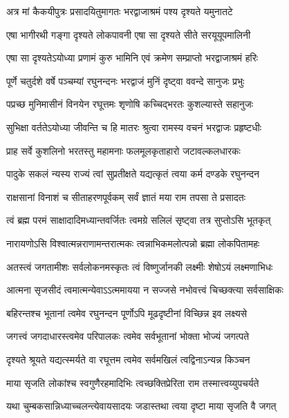 \twolineshloka
{अत्र मां कैकयीपुत्रः प्रसादयितुमागतः}
{भरद्वाजाश्रमं पश्य दृश्यते यमुनातटे} %

\twolineshloka
{एषा भागीरथी गङ्गा दृश्यते लोकपावनी}
{एषा सा दृश्यते सीते सरयूयूपमालिनी} %

\twolineshloka
{एषा सा दृश्यतेऽयोध्या प्रणामं कुरु भामिनि}
{एवं क्रमेण सम्प्राप्तो भरद्वाजाश्रमं हरिः} %

\twolineshloka
{पूर्णे चतुर्दशे वर्षे पञ्चम्यां रघुनन्दनः}
{भरद्वाजं मुनिं दृष्ट्वा ववन्दे सानुजः प्रभुः} %

\twolineshloka
{पप्रच्छ मुनिमासीनं विनयेन रघूत्तमः}
{शृणोषि कच्चिद्भरतः कुशल्यास्ते सहानुजः} %

\twolineshloka
{सुभिक्षा वर्ततेऽयोध्या जीवन्ति च हि मातरः}
{श्रुत्वा रामस्य वचनं भरद्वाजः प्रहृष्टधीः} %

\twolineshloka
{प्राह सर्वे कुशलिनो भरतस्तु महामनाः}
{फलमूलकृताहारो जटावल्कलधारकः} %

\twolineshloka
{पादुके सकलं न्यस्य राज्यं त्वां सुप्रतीक्षते}
{यद्यत्कृतं त्वया कर्म दण्डके रघुनन्दन} %

\twolineshloka
{राक्षसानां विनाशं च सीताहरणपूर्वकम्}
{सर्वं ज्ञातं मया राम तपसा ते प्रसादतः} %

\twolineshloka
{त्वं ब्रह्म परमं साक्षादादिमध्यान्तवर्जितः}
{त्वमग्रे सलिलं सृष्ट्वा तत्र सुप्तोऽसि भूतकृत्} %

\twolineshloka
{नारायणोऽसि विश्वात्मन्नराणामन्तरात्मकः}
{त्वन्नाभिकमलोत्पन्नो ब्रह्मा लोकपितामहः} %

\twolineshloka
{अतस्त्वं जगतामीशः सर्वलोकनमस्कृतः}
{त्वं विष्णुर्जानकी लक्ष्मीः शेषोऽयं लक्ष्मणाभिधः} %

\twolineshloka
{आत्मना सृजसीदं त्वमात्मन्येवाऽऽत्ममायया}
{न सज्जसे नभोवत्त्वं चिच्छक्त्या सर्वसाक्षिकः} %

\twolineshloka
{बहिरन्तश्च भूतानां त्वमेव रघुनन्दन}
{पूर्णोऽपि मूढदृष्टीनां विच्छिन्न इव लक्ष्यसे} %

\twolineshloka
{जगत्त्वं जगदाधारस्त्वमेव परिपालकः}
{त्वमेव सर्वभूतानां भोक्ता भोज्यं जगत्पते} %

\twolineshloka
{दृश्यते श्रूयते यद्यत्स्मर्यते वा रघूत्तम}
{त्वमेव सर्वमखिलं त्वद्विनाऽन्यन्न किञ्चन} %

\twolineshloka
{माया सृजति लोकांश्च स्वगुणैरहमादिभिः}
{त्वच्छक्तिप्रेरिता राम तस्मात्त्वय्युपचर्यते} %

\twolineshloka
{यथा चुम्बकसान्निध्याच्चलन्त्येवायसादयः}
{जडास्तथा त्वया दृष्टा माया सृजति वै जगत्} %

